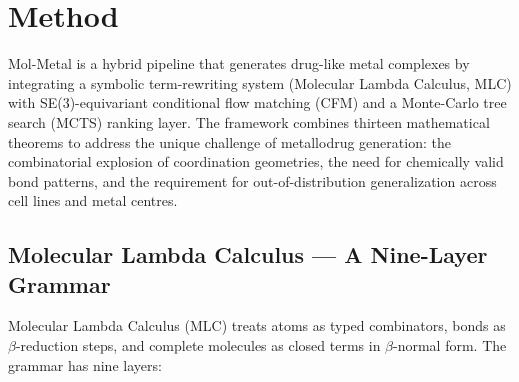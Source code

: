 
\section{Method}
\label{sec:method}

Mol-Metal is a hybrid pipeline that generates drug-like metal complexes by
integrating a symbolic term-rewriting system (Molecular Lambda Calculus,
MLC) with SE(3)-equivariant conditional flow matching (CFM) and a Monte-Carlo
tree search (MCTS) ranking layer.  The framework combines thirteen
mathematical theorems to address the unique challenge of metallodrug
generation: the combinatorial explosion of coordination geometries, the
need for chemically valid bond patterns, and the requirement for
out-of-distribution generalization across cell lines and metal centres.

\subsection{Molecular Lambda Calculus --- A Nine-Layer Grammar}
\label{sec:mlc}

Molecular Lambda Calculus (MLC) treats atoms as typed combinators, bonds as
$\beta$-reduction steps, and complete molecules as closed terms in
$\beta$-normal form.  The grammar has nine layers:

